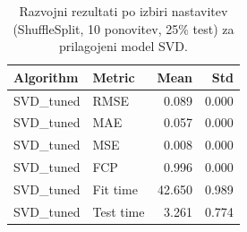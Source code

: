 \begin{table}[h]
\centering
\caption{Razvojni rezultati po izbiri nastavitev (ShuffleSplit, 10 ponovitev, 25\% test) za prilagojeni model SVD.}
\label{tab:cv_results_tuned_svd}
\begin{tabular}{llrr}
\toprule
Algorithm & Metric & Mean & Std \\
\midrule
SVD\_tuned & RMSE & 0.089 & 0.000 \\
SVD\_tuned & MAE & 0.057 & 0.000 \\
SVD\_tuned & MSE & 0.008 & 0.000 \\
SVD\_tuned & FCP & 0.996 & 0.000 \\
SVD\_tuned & Fit time & 42.650 & 0.989 \\
SVD\_tuned & Test time & 3.261 & 0.774 \\
\bottomrule
\end{tabular}

\end{table}
